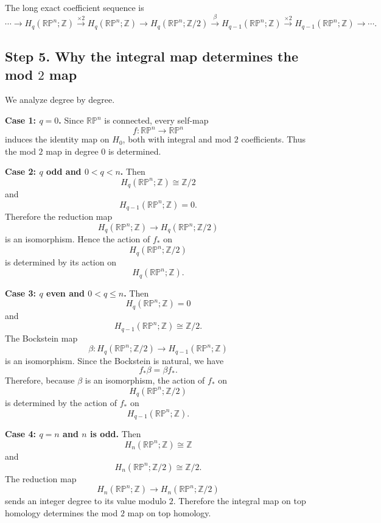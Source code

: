 \documentclass[12pt,a4paper]{article}
\theoremstyle{notespace}
\begin{document}
The long exact coefficient sequence is
\[
\cdots
\longrightarrow
H_q(\mathbb{RP}^n;\mathbb Z)
\xrightarrow{\times 2}
H_q(\mathbb{RP}^n;\mathbb Z)
\longrightarrow
H_q(\mathbb{RP}^n;\mathbb Z/2)
\xrightarrow{\beta}
H_{q-1}(\mathbb{RP}^n;\mathbb Z)
\xrightarrow{\times 2}
H_{q-1}(\mathbb{RP}^n;\mathbb Z)
\longrightarrow
\cdots .
\]

\subsection*{Step 5. Why the integral map determines the mod \(2\) map}

We analyze degree by degree.

\medskip

\textbf{Case 1: \(q=0\).}
Since \(\mathbb{RP}^n\) is connected, every self-map
\[
f:\mathbb{RP}^n\longrightarrow \mathbb{RP}^n
\]
induces the identity map on \(H_0\), both with integral and mod \(2\) coefficients. Thus the mod \(2\) map in degree \(0\) is determined.

\medskip

\textbf{Case 2: \(q\) odd and \(0<q<n\).}
Then
\[
H_q(\mathbb{RP}^n;\mathbb Z)\cong \mathbb Z/2
\]
and
\[
H_{q-1}(\mathbb{RP}^n;\mathbb Z)=0.
\]
Therefore the reduction map
\[
H_q(\mathbb{RP}^n;\mathbb Z)
\longrightarrow
H_q(\mathbb{RP}^n;\mathbb Z/2)
\]
is an isomorphism. Hence the action of \(f_*\) on
\[
H_q(\mathbb{RP}^n;\mathbb Z/2)
\]
is determined by its action on
\[
H_q(\mathbb{RP}^n;\mathbb Z).
\]

\medskip

\textbf{Case 3: \(q\) even and \(0<q\le n\).}
Then
\[
H_q(\mathbb{RP}^n;\mathbb Z)=0
\]
and
\[
H_{q-1}(\mathbb{RP}^n;\mathbb Z)\cong \mathbb Z/2.
\]
The Bockstein map
\[
\beta:
H_q(\mathbb{RP}^n;\mathbb Z/2)
\longrightarrow
H_{q-1}(\mathbb{RP}^n;\mathbb Z)
\]
is an isomorphism. Since the Bockstein is natural, we have
\[
f_*\beta=\beta f_*.
\]
Therefore, because \(\beta\) is an isomorphism, the action of \(f_*\) on
\[
H_q(\mathbb{RP}^n;\mathbb Z/2)
\]
is determined by the action of \(f_*\) on
\[
H_{q-1}(\mathbb{RP}^n;\mathbb Z).
\]

\medskip

\textbf{Case 4: \(q=n\) and \(n\) is odd.}
Then
\[
H_n(\mathbb{RP}^n;\mathbb Z)\cong \mathbb Z
\]
and
\[
H_n(\mathbb{RP}^n;\mathbb Z/2)\cong \mathbb Z/2.
\]
The reduction map
\[
H_n(\mathbb{RP}^n;\mathbb Z)
\longrightarrow
H_n(\mathbb{RP}^n;\mathbb Z/2)
\]
sends an integer degree to its value modulo \(2\). Therefore the integral map on top homology determines the mod \(2\) map on top homology.
\end{document}
